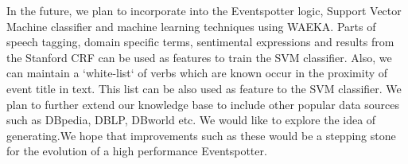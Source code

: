 \documentclass[a4paper,11pt]{report}
\begin{document}
In the future, we plan to incorporate into the Eventspotter logic, Support Vector Machine classifier and machine learning techniques using WAEKA. Parts of speech tagging, domain specific terms, sentimental expressions and results from the Stanford CRF can be used as features to train the SVM classifier. Also, we can maintain a `white-list` of verbs which are known occur in the proximity of event title in text. This list can be also used as feature to the SVM classifier. We plan to further extend our knowledge base to include other popular data sources such as DBpedia, DBLP, DBworld etc. We would like to explore the idea of generating.We hope that improvements such as these would be a stepping stone for the evolution of a high performance Eventspotter.
{}
\end{document}
